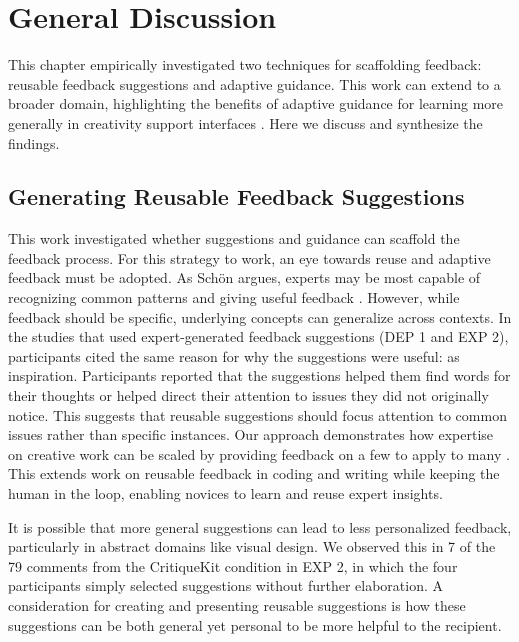 \section{General Discussion}
This chapter empirically investigated two techniques for scaffolding feedback: reusable feedback suggestions and adaptive guidance. This work can extend to a broader domain, highlighting the benefits of adaptive guidance for learning more generally in creativity support interfaces \cite{Shneiderman2007}. Here we discuss and synthesize the findings.  

\subsection{Generating Reusable Feedback Suggestions}
This work investigated whether suggestions and guidance can scaffold the feedback process. For this strategy to work, an eye towards reuse and adaptive feedback must be adopted. As Schön argues, experts may be most capable of recognizing common patterns and giving useful feedback \cite{Schon1983}. However, while feedback should be specific, underlying concepts can generalize across contexts. In the studies that used expert-generated feedback suggestions (DEP 1 and EXP 2), participants cited the same reason for why the suggestions were useful: as inspiration. Participants reported that the suggestions helped them find words for their thoughts or helped direct their attention to issues they did not originally notice. This suggests that reusable suggestions should focus attention to common issues rather than specific instances. Our approach demonstrates how expertise on creative work can be scaled by providing feedback on a few to apply to many \cite{Kulkarni2013}. This extends work on reusable feedback in coding and writing \cite{Brooks2014, Hartmann2010, Head2017} while keeping the human in the loop, enabling novices to learn and reuse expert insights. 

It is possible that more general suggestions can lead to less personalized feedback, particularly in abstract domains like visual design. We observed this in 7 of the 79 comments from the CritiqueKit condition in EXP 2, in which the four participants simply selected suggestions without further elaboration. A consideration for creating and presenting reusable suggestions is how these suggestions can be both general yet personal to be more helpful to the recipient. 

